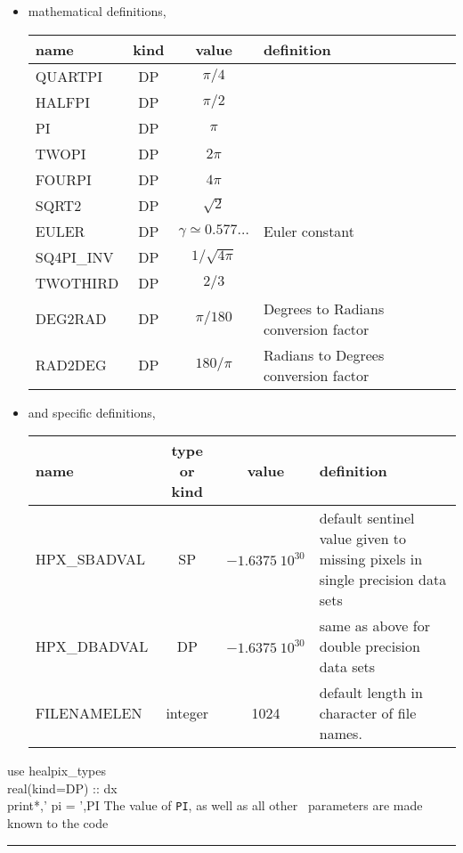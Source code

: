 \begin{itemize}
\item
mathematical definitions, \\
\begin{mytable}{%
\begin{tabularx}{\linewidth}{lcc X}
name & kind & value & definition \\
\hline
QUARTPI & DP & $\pi/4$ & \\
HALFPI & DP & $\pi/2$ & \\
PI & DP & $\pi$ & \\
TWOPI & DP & $2\pi$ & \\
FOURPI & DP & $4\pi$ & \\
SQRT2 & DP & $\sqrt{2}$ & \\
EULER & DP & $\gamma \simeq 0.577\ldots$ & Euler constant \\
SQ4PI\_INV & DP & $1/\sqrt{4\pi}$ & \\
TWOTHIRD & DP & $2/3$ & \\
DEG2RAD & DP & $\pi/180$ & Degrees to Radians conversion factor\\
RAD2DEG & DP & $180/\pi$ & Radians to Degrees conversion factor\\
\hline
\end{tabularx}
}
\end{mytable}

\item
and \healpix specific definitions, \\
\begin{mytable}{%
\begin{tabularx}{\linewidth}{lcc X}
name & type or kind & value & definition \\
\hline
HPX\_SBADVAL & SP & $-1.6375\ 10^{30}$ & default sentinel value given to missing
pixels in single precision data sets \\
HPX\_DBADVAL & DP & $-1.6375\ 10^{30}$ & same as above for double precision data
sets\\
FILENAMELEN & integer & 1024 & default length in character of file names. \\
\hline
\end{tabularx}
}
\end{mytable}

\end{itemize}

\begin{example}
{
use healpix\_types \\
real(kind=DP) :: dx \\
print*,' pi = ',PI
}
{
The value of {\tt PI}, as well as all other \thedocid\ parameters are made known
to the code
}
\end{example}


\rule{\hsize}{2mm}

\newpage
